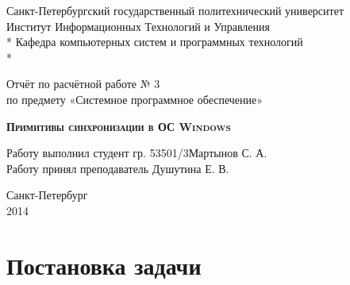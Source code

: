 \documentclass[a4paper, 12pt]{article}		%
\begin{document}
\begin{titlepage}
\thispagestyle{empty}

\begin{center}
Санкт-Петербургский государственный политехнический университет \\
Институт Информационных Технологий и Управления \\*
Кафедра компьютерных систем и программных технологий \\*
\hrulefill
\end{center}

\vspace{18em}

\begin{center}
\Large Отчёт по расчётной работе № 3 \\ по предмету «Системное программное обеспечение» \\
\end{center}

\vspace{1em}

\begin{center}
\textsc{\textbf{Примитивы синхронизации в ОС Windows}}
\end{center}

\vspace{16em}

\begin{flushleft}
Работу выполнил студент гр. 53501/3\hrulefill Мартынов С. А. \\
\vspace{1.5em}
Работу принял преподаватель \hrulefill Душутина Е. В. \\
\end{flushleft}

\vspace{\fill}

\begin{center}
Санкт-Петербург \\
2014
\end{center}

\end{titlepage}
\setcounter{page}{2}
\tableofcontents
\newpage
\section*{Постановка задачи}
\end{document}
